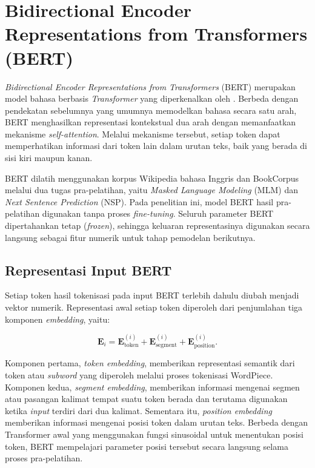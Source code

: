 \section{Bidirectional Encoder Representations from Transformers (BERT)}
\label{sec:bert}

\textit{Bidirectional Encoder Representations from Transformers} (BERT) merupakan model bahasa berbasis \textit{Transformer} yang diperkenalkan oleh \parencite{devlin2018bert}. Berbeda dengan pendekatan sebelumnya yang umumnya memodelkan bahasa secara satu arah, BERT menghasilkan representasi kontekstual dua arah dengan memanfaatkan mekanisme \textit{self-attention}. Melalui mekanisme tersebut, setiap token dapat memperhatikan informasi dari token lain dalam urutan teks, baik yang berada di sisi kiri maupun kanan.

BERT dilatih menggunakan korpus Wikipedia bahasa Inggris dan BookCorpus melalui dua tugas pra-pelatihan, yaitu \textit{Masked Language Modeling} (MLM) dan \textit{Next Sentence Prediction} (NSP). Pada penelitian ini, model BERT hasil pra-pelatihan digunakan tanpa proses \textit{fine-tuning}. Seluruh parameter BERT dipertahankan tetap (\textit{frozen}), sehingga keluaran representasinya digunakan secara langsung sebagai fitur numerik untuk tahap pemodelan berikutnya.

\subsection{Representasi Input BERT}
\label{subsec:bert_input}

Setiap token hasil tokenisasi pada input BERT terlebih dahulu diubah menjadi vektor numerik. Representasi awal setiap token diperoleh dari penjumlahan tiga komponen \textit{embedding}, yaitu:

\begin{equation}
\mathbf{E}_i = \mathbf{E}_{\text{token}}^{(i)} + \mathbf{E}_{\text{segment}}^{(i)} + \mathbf{E}_{\text{position}}^{(i)}.
\end{equation}

Komponen pertama, \textit{token embedding}, memberikan representasi semantik dari token atau \textit{subword} yang diperoleh melalui proses tokenisasi WordPiece. Komponen kedua, \textit{segment embedding}, memberikan informasi mengenai segmen atau pasangan kalimat tempat suatu token berada dan terutama digunakan ketika \textit{input} terdiri dari dua kalimat. Sementara itu, \textit{position embedding} memberikan informasi mengenai posisi token dalam urutan teks. Berbeda dengan Transformer awal yang menggunakan fungsi sinusoidal untuk menentukan posisi token, BERT mempelajari parameter posisi tersebut secara langsung selama proses pra-pelatihan.

